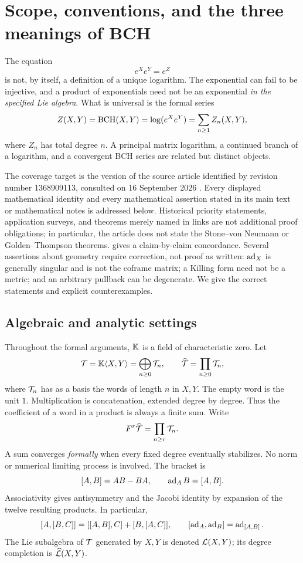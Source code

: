 \section{Scope, conventions, and the three meanings of BCH}\label{sec:scope}
The equation
\begin{equation}\label{eq:main}
 e^Xe^Y=e^Z
\end{equation}
is not, by itself, a definition of a unique logarithm. The exponential can fail to be injective, and a product of exponentials need not be an exponential \emph{in the specified Lie algebra}. What is universal is the formal series
\begin{equation}\label{eq:formal-bch}
 Z(X,Y)=\operatorname{BCH}(X,Y)=\log(e^Xe^Y)=\sum_{n\geq1}Z_n(X,Y),
\end{equation}
where $Z_n$ has total degree $n$. A principal matrix logarithm, a continued branch of a logarithm, and a convergent BCH series are related but distinct objects.

The coverage target is the version of the source article identified by revision number 1368909113, consulted on 16 September 2026 \cite{Wikipedia}. Every displayed mathematical identity and every mathematical assertion stated in its main text or mathematical notes is addressed below. Historical priority statements, application surveys, and theorems merely named in links are not additional proof obligations; in particular, the article does not state the Stone--von Neumann or Golden--Thompson theorems.  gives a claim-by-claim concordance. Several assertions about geometry require correction, not proof as written: $\operatorname{ad}_X$ is generally singular and is not the coframe matrix; a Killing form need not be a metric; and an arbitrary pullback can be degenerate. We give the correct statements and explicit counterexamples.

\subsection{Algebraic and analytic settings}
Throughout the formal arguments, $\mathbb K$ is a field of characteristic zero. Let
\[
 \mathcal T=\mathbb K\langle X,Y\rangle=\bigoplus_{n\geq0}\mathcal T_n,
 \qquad \widehat{\mathcal T}=\prod_{n\geq0}\mathcal T_n,
\]
where $\mathcal T_n$ has as a basis the words of length $n$ in $X,Y$. The empty word is the unit $1$. Multiplication is concatenation, extended degree by degree. Thus the coefficient of a word in a product is always a finite sum. Write
\[
 F^r\widehat{\mathcal T}=\prod_{n\geq r}\mathcal T_n.
\]
A sum converges \emph{formally} when every fixed degree eventually stabilizes. No norm or numerical limiting process is involved. The bracket is
\begin{equation}\label{eq:bracket}
 [A,B]=AB-BA,\qquad \operatorname{ad}_A B=[A,B].
\end{equation}
Associativity gives antisymmetry and the Jacobi identity by expansion of the twelve resulting products. In particular,
\begin{equation}\label{eq:derivation}
 [A,[B,C]]=[[A,B],C]+[B,[A,C]],
 \qquad [\operatorname{ad}_A,\operatorname{ad}_B]=\operatorname{ad}_{[A,B]}.
\end{equation}
The Lie subalgebra of $\mathcal T$ generated by $X,Y$ is denoted $\mathcal L(X,Y)$; its degree completion is $\widehat{\mathcal L}(X,Y)$.


